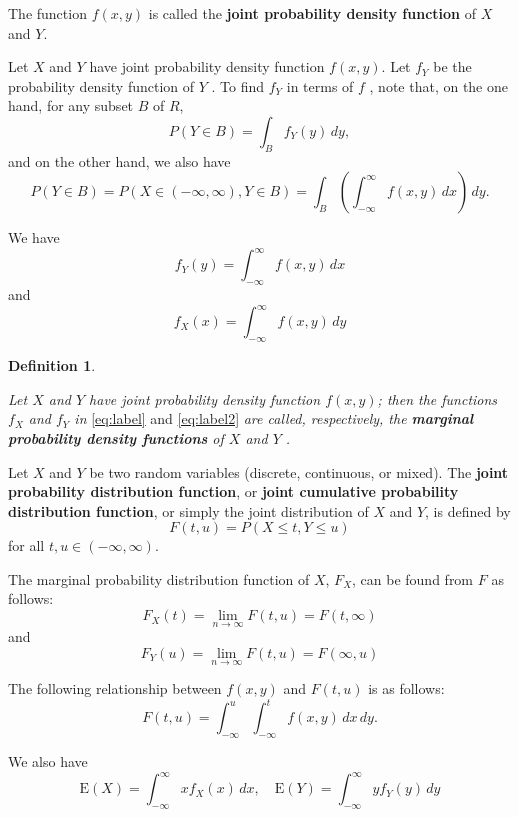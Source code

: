 \documentclass[
]{book}
\theoremstyle{definition}
\newtheorem{definition}{Definition}[chapter]
\theoremstyle{definition}
\theoremstyle{definition}
\theoremstyle{definition}
\theoremstyle{remark}
\begin{document}
The function \(f (x, y)\) is called the \textbf{joint probability density
function} of \(X\) and \(Y\).

Let \(X\) and \(Y\) have joint probability density function \(f (x, y)\). Let
\(f_Y\) be the probability density function of \(Y\) . To find \(f_Y\) in
terms of \(f\) , note that, on the one hand, for any subset \(B\) of \(R\),
\[P(Y \in B) = \int_B f_Y(y) \, dy,\] and on the other hand, we also
have
\[P(Y \in B) = P(X \in (-\infty, \infty), Y \in B) = \int_B \left(    \int_{-\infty}^\infty f(x,y)\, dx  \right) \, dy.\]

We have
\begin{equation} 
\label{eq:label} f_Y(y) =   \int_{-\infty}^\infty f(x,y)\, dx
\end{equation}
and
\begin{equation} 
\label{eq:label2}  f_X(x) =   \int_{-\infty}^\infty f(x,y)\, dy
\end{equation}

\begin{definition}
\protect\hypertarget{def:unlabeled-div-19}{}\label{def:unlabeled-div-19}

\emph{Let \(X\) and \(Y\) have joint probability density
function \(f (x, y)\); then the functions \(f_X\) and \(f_Y\) in} \eqref{eq:label} and \eqref{eq:label2}
\emph{are called,
respectively, the \textbf{marginal probability density functions} of \(X\) and
\(Y\) .}

\end{definition}

Let \(X\) and \(Y\) be two random variables (discrete, continuous, or
mixed). The \textbf{joint probability distribution function}, or \textbf{joint
cumulative probability distribution function}, or simply the joint
distribution of \(X\) and \(Y\), is defined by
\[F(t, u) = P(X \le t, Y \le u)\] for all \(t, u \in (-\infty, \infty)\).

The marginal probability distribution function of \(X\), \(F_X\), can be
found from \(F\) as follows:
\[F_X(t) = \lim_{n \rightarrow \infty} F(t,u)  = F(t, \infty)\] and
\[F_Y(u) = \lim_{n \rightarrow \infty}F(t,u)  = F( \infty, u)\]

The following relationship between \(f(x,y)\) and \(F(t,u)\) is as follows:
\[F(t,u) = \int_{-\infty}^{u}\int_{-\infty}^{t} f(x,y)\, dx\, dy.\]

We also have
\[\mathrm{E}(X) =   \int_{-\infty}^\infty x f_X(x)\, dx , \quad \mathrm{E}(Y) =   \int_{-\infty}^\infty y f_Y(y)\, dy\]
\end{document}

